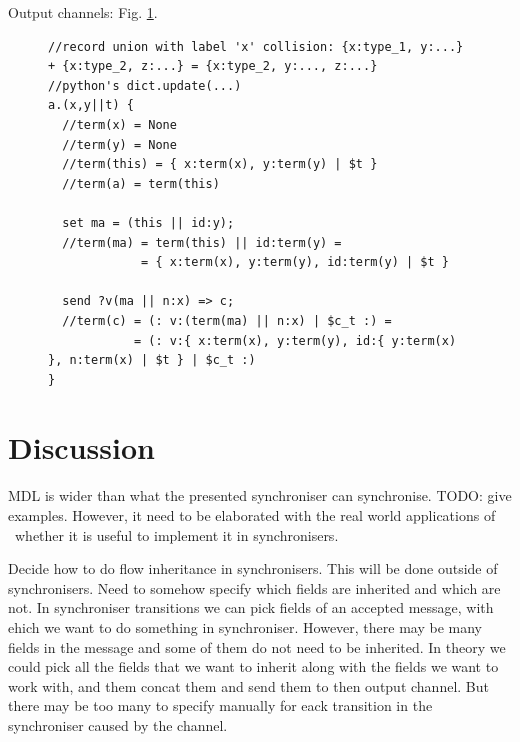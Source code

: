 Output channels: Fig. \ref{b}.
\begin{figure}[h!]
\begin{lstlisting}[frame=single]
//record union with label 'x' collision: {x:type_1, y:...} + {x:type_2, z:...} = {x:type_2, y:..., z:...}
//python's dict.update(...)
a.(x,y||t) {
  //term(x) = None
  //term(y) = None
  //term(this) = { x:term(x), y:term(y) | $t }
  //term(a) = term(this)

  set ma = (this || id:y);
  //term(ma) = term(this) || id:term(y) =
             = { x:term(x), y:term(y), id:term(y) | $t }

  send ?v(ma || n:x) => c;
  //term(c) = (: v:(term(ma) || n:x) | $c_t :) =
            = (: v:{ x:term(x), y:term(y), id:{ y:term(x) }, n:term(x) | $t } | $c_t :)
}
\end{lstlisting}
\label{b}
\end{figure}


\section{Discussion}
MDL is wider than what the presented synchroniser can synchronise. TODO: give examples. However, it need to be elaborated with the real world applications of \ak\ whether it is useful to implement it in synchronisers.

Decide how to do flow inheritance in synchronisers. This will be done outside of synchronisers. Need to somehow specify which fields are inherited and which are not. In synchroniser transitions we can pick fields of an accepted message, with ehich we want to do something in synchroniser. However, there may be many fields in the message and some of them do not need to be inherited. In theory we could pick all the fields that we want to inherit along with the fields we want to work with, and them concat them and send them to then output channel. But there may be too many to specify manually for eack transition in the synchroniser caused by the channel.
